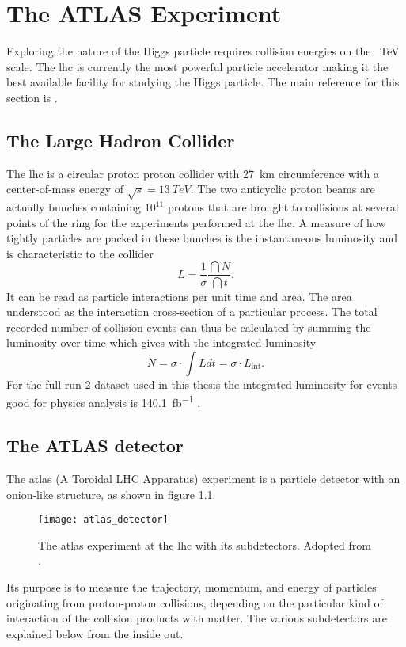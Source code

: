 \chapter{The ATLAS Experiment}\label{sec:atlas}
Exploring the nature of the Higgs particle requires collision energies on the \qty[]{}{TeV} scale. The \ac{lhc} is currently the most powerful particle accelerator making it the best available facility for studying the Higgs particle. The main reference for this section is \citep{aad2008atlas}.

\section{The Large Hadron Collider}
The \ac{lhc} is a circular proton proton collider with \qty[]{27}{km} circumference with a center-of-mass energy of $\sqrt{s}=\qty[]{13}{TeV}$. The two anticyclic proton beams are actually bunches containing $10^{11}$ protons that are brought to collisions at several points of the ring for the experiments performed at the \ac{lhc}. A measure of how tightly particles are packed in these bunches is the instantaneous luminosity and is characteristic to the collider
\begin{equation}
    L=\frac{1}{\sigma}\frac{\dint{N}}{\dint{t}}.
\end{equation}
It can be read as particle interactions per unit time and area. The area understood as the interaction cross-section of a particular process. The total recorded number of collision events can thus be calculated by summing the luminosity over time which gives with the integrated luminosity
\begin{equation}
    N=\sigma\cdot\int L dt=\sigma\cdot L_\mathrm{int}.
\end{equation}
For the full run 2 dataset used in this thesis the integrated luminosity for events good for physics analysis is \qty[]{140.1}{fb^{-1}} \citep{DAPR-2021-01}.

\section{The ATLAS detector}
The \ac{atlas} (A Toroidal LHC Apparatus) experiment is a particle detector with an onion-like structure, as shown in figure \ref{fig:atlas_detector}.
\begin{figure}
    \centering
    \texttt{[image: atlas\_detector]}
    \caption[]{The \ac{atlas} experiment at the \ac{lhc} with its subdetectors. Adopted from \citep{Pequenao:1095924}.}
    \label{fig:atlas_detector}
\end{figure}
Its purpose is to measure the trajectory, momentum, and energy of particles originating from proton-proton collisions, depending on the particular kind of interaction of the collision products with matter. The various subdetectors are explained below from the inside out.

